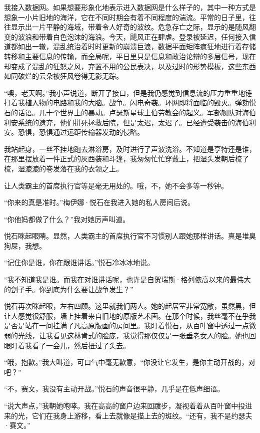 \documentclass[AutoFakeBold=true]{book}
\begin{document}
我接入数据网。如果想要形象化地表示进入数据网是什么样子的，其中一种方式是想象一小片旧地的海洋，它在不同时期会有着不同程度的湍流。平常的日子里，往往显示出一片平静的海域，带着令人好奇的波纹。危急存亡之际，显示的是随风翻变的波浪和带着白色泡沫的海浪。今天，飓风正在肆虐。登录被延迟，任何接入信道都如出一辙，混乱统治着时时更新的崩溃巨浪，数据平面矩阵疯狂地进行着存储转移和主要信息的传输，而全局呢，平日里只是信息和政治论辩的多层信号，现在却变成了混乱的狂怒之风，弃置不用的公民表决，以及过时的形势模板，这些东西如同破烂的云朵被狂风卷得无影无踪。

``噢，老天啊。''我小声说道，断开了接口，但是我仍感觉到信息流的压力重重地锤打着我植入物的电路和我的大脑。战争。闪电奇袭。环网即将面临的毁灭。弹劾悦石的话语。几十个世界上的暴动。卢瑟斯星球上伯劳教会的起义。军部舰队对海伯利安系统的遗弃，他们拼死拯救后院，但是太迟，太迟了。已经遭受袭击的海伯利安。恐惧，恐惧通过远距传输器发动的侵略。

我站起身，一丝不挂地跑去淋浴房，及时进行了声波洗浴。不知道是亨特还是谁，在那里摆放着一件正式的灰西装和斗篷，我匆匆忙忙穿戴上，把湿头发朝后梳了梳，湿漉漉的卷发落在我的衣领之上。

让人类霸主的首席执行官等是毫无用处的。哦，不，她不会多等一秒钟。

\vspace*{1em}

``你来的真是准时。''梅伊娜·悦石在我进入她的私人房间后说。

``你他妈都做了什么？''我对她厉声叫道。

悦石眯起眼睛。显然，人类霸主的首席执行官不习惯别人跟她那样讲话。{\kaishu 真是堆臭狗屎}，我想。

``记住你是谁，你在跟谁讲话。''悦石冷冰冰地说。

``我不知道我是谁。而我在对谁讲话呢，也许是自贺瑞斯·格列侬高以来的最伟大的刽子手。你到底为什么要让战争发生？''

悦石再次眯起眼，左右四顾。这里就我们两人。她的起居室非常宽敞，虽然黑，但让人感觉很舒服，墙上挂着来自旧地的原版艺术画。在那个时候，我丝毫不在乎我是否是站在一间挂满了凡高原版画的房间里。我盯着悦石，从百叶窗中透过一点微弱的光线，让我看见这林肯式的脸庞，我觉得那仅仅是一张垂老女人的脸。她也回眼盯着我看了一会儿，然后扭过了头去。

``哦，抱歉。''我大叫道，可口气中毫无歉意，``你没让它发生，是你主动开战的，对吧？''

``不，赛文，我没有主动开战。''悦石的声音很平静，几乎是在低声细语。

``说大声点，''我朝她咆哮。我在高高的窗户边来回踱步，凝视着着从百叶窗中投进来的光，它们在我身上游移，看上去就像是描上去的斑纹。``还有，我不是约瑟夫·赛文。''
\end{document}
